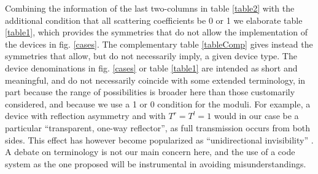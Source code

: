 \begin{table}
\caption{Device types allowed for a given symmetry.
\vspace*{.3cm}\label{tableComp}}
\centering
{}

\end{table}





Combining the information of the last two-columns in table \ref{table2} with the additional condition that all scattering coefficients
be 0 or 1 we elaborate table \ref{table1}, which provides
the symmetries
that do not allow the implementation of the devices in fig. \ref{cases}.
The complementary table \ref{tableComp} gives instead the symmetries that allow, but do not necessarily imply,
a given device type.
The device denominations in fig. \ref{cases} or table \ref{table1} are intended as short and meaningful, and do not necessarily coincide with
some extended terminology, in part because the range of possibilities is broader here than those customarily considered, and because we
use a 1 or 0 condition for the moduli.
For example, a device with reflection asymmetry and with $T^r=T^l=1$ would in our case be a particular
``transparent, one-way reflector'', as full transmission occurs from both sides.
This effect has however become popularized as ``unidirectional invisibility'' \cite{Lin2011,Yin2013}.
A debate on terminology is not our main concern here, and the use of a code system
as the one proposed will be instrumental in avoiding misunderstandings.


